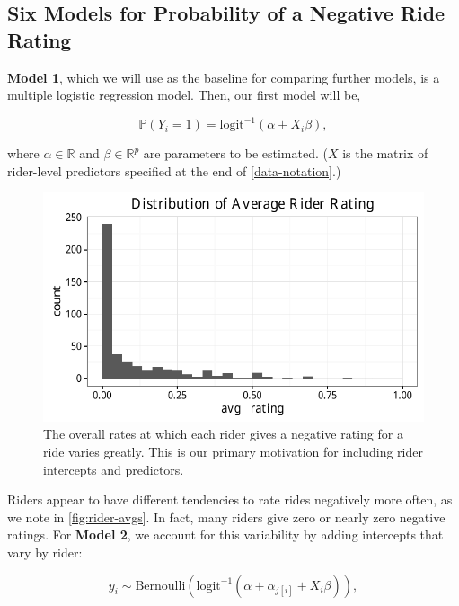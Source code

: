 \documentclass[]{article}
\begin{document}
\subsection{Six Models for Probability of a Negative Ride
Rating}\label{ride-models}

\textbf{Model 1}, which we will use as the baseline for comparing
further models, is a multiple logistic regression model. Then, our first
model will be,

\[ \mathbb{P} (Y_i=1) = \text{logit}^{-1} (\alpha + X_i \beta),\]

where \(\alpha \in \mathbb{R}\) and \(\beta \in \mathbb{R}^p\) are
parameters to be estimated. (\(X\) is the matrix of rider-level
predictors specified at the end of \autoref{data-notation}.)

\begin{figure}[tbh]
\centering
\includegraphics[angle = 0,scale = 1]{figure/rider_avgs.pdf}
\caption[The overall rates at which each rider gives a negative rating for a
ride varies greatly. This is our primary motivation for including rider intercepts
and predictors.]{\normalsize{The overall rates at which each rider gives a negative rating for a
ride varies greatly. This is our primary motivation for including rider intercepts
and predictors.}}
\label{fig:rider-avgs}
\end{figure}

Riders appear to have different tendencies to rate rides negatively more
often, as we note in \autoref{fig:rider-avgs}. In fact, many riders give
zero or nearly zero negative ratings. For \textbf{Model 2}, we account
for this variability by adding intercepts that vary by rider:

\begin{equation}
y_i \sim \text{Bernoulli} \left(
\text{logit}^{-1} \left( \alpha + \alpha_{j[i]} + X_i \beta \right)
\right),
\end{equation}
\end{document}
